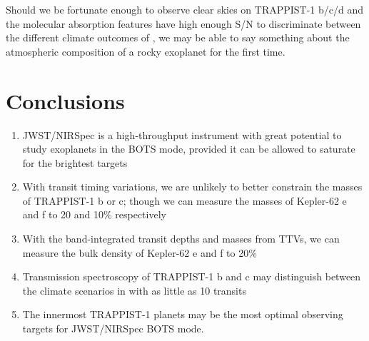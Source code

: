 Should we be fortunate enough to observe clear skies on TRAPPIST-1 b/c/d and the molecular absorption features have high enough S/N to discriminate between the different climate outcomes of \citet{Lincowski2018}, we may be able to say something about the atmospheric composition of a rocky exoplanet for the first time.

\section{Conclusions}

\begin{enumerate}
    \item JWST/NIRSpec is a high-throughput instrument with great potential to study exoplanets in the BOTS mode, provided it can be allowed to saturate for the brightest targets
    \item With transit timing variations, we are unlikely to better constrain the masses of TRAPPIST-1 b or c; though we can measure the masses of Kepler-62 e and f to 20 and 10\% respectively
    \item With the band-integrated transit depths and masses from TTVs, we can measure the bulk density of Kepler-62 e and f to 20\%
    \item Transmission spectroscopy of TRAPPIST-1 b and c may distinguish between the climate scenarios in \citet{Lincowski2018} with as little as 10 transits
    \item The innermost TRAPPIST-1 planets may be the most optimal observing targets for JWST/NIRSpec BOTS mode.
\end{enumerate}

%
%
%
%
%
%
%
%


%

